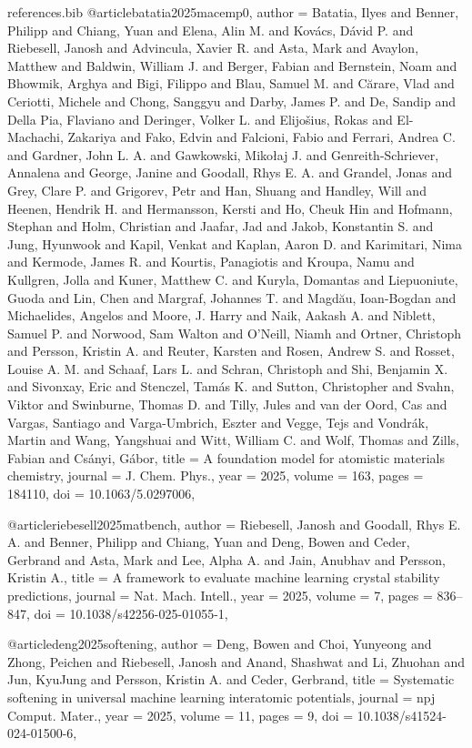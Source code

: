 \begin{filecontents*}[overwrite]{references.bib}
@article{batatia2025macemp0,
  author = {Batatia, Ilyes and Benner, Philipp and Chiang, Yuan and Elena, Alin M. and Kovács, Dávid P. and Riebesell, Janosh and Advincula, Xavier R. and Asta, Mark and Avaylon, Matthew and Baldwin, William J. and Berger, Fabian and Bernstein, Noam and Bhowmik, Arghya and Bigi, Filippo and Blau, Samuel M. and Cărare, Vlad and Ceriotti, Michele and Chong, Sanggyu and Darby, James P. and De, Sandip and Della Pia, Flaviano and Deringer, Volker L. and Elijošius, Rokas and El-Machachi, Zakariya and Fako, Edvin and Falcioni, Fabio and Ferrari, Andrea C. and Gardner, John L. A. and Gawkowski, Mikołaj J. and Genreith-Schriever, Annalena and George, Janine and Goodall, Rhys E. A. and Grandel, Jonas and Grey, Clare P. and Grigorev, Petr and Han, Shuang and Handley, Will and Heenen, Hendrik H. and Hermansson, Kersti and Ho, Cheuk Hin and Hofmann, Stephan and Holm, Christian and Jaafar, Jad and Jakob, Konstantin S. and Jung, Hyunwook and Kapil, Venkat and Kaplan, Aaron D. and Karimitari, Nima and Kermode, James R. and Kourtis, Panagiotis and Kroupa, Namu and Kullgren, Jolla and Kuner, Matthew C. and Kuryla, Domantas and Liepuoniute, Guoda and Lin, Chen and Margraf, Johannes T. and Magdău, Ioan-Bogdan and Michaelides, Angelos and Moore, J. Harry and Naik, Aakash A. and Niblett, Samuel P. and Norwood, Sam Walton and O’Neill, Niamh and Ortner, Christoph and Persson, Kristin A. and Reuter, Karsten and Rosen, Andrew S. and Rosset, Louise A. M. and Schaaf, Lars L. and Schran, Christoph and Shi, Benjamin X. and Sivonxay, Eric and Stenczel, Tamás K. and Sutton, Christopher and Svahn, Viktor and Swinburne, Thomas D. and Tilly, Jules and van der Oord, Cas and Vargas, Santiago and Varga-Umbrich, Eszter and Vegge, Tejs and Vondrák, Martin and Wang, Yangshuai and Witt, William C. and Wolf, Thomas and Zills, Fabian and Csányi, Gábor},
  title = {A foundation model for atomistic materials chemistry},
  journal = {J. Chem. Phys.},
  year = {2025},
  volume = {163},
  pages = {184110},
  doi = {10.1063/5.0297006},
}

@article{riebesell2025matbench,
  author = {Riebesell, Janosh and Goodall, Rhys E. A. and Benner, Philipp and Chiang, Yuan and Deng, Bowen and Ceder, Gerbrand and Asta, Mark and Lee, Alpha A. and Jain, Anubhav and Persson, Kristin A.},
  title = {A framework to evaluate machine learning crystal stability predictions},
  journal = {Nat. Mach. Intell.},
  year = {2025},
  volume = {7},
  pages = {836--847},
  doi = {10.1038/s42256-025-01055-1},
}

@article{deng2025softening,
  author = {Deng, Bowen and Choi, Yunyeong and Zhong, Peichen and Riebesell, Janosh and Anand, Shashwat and Li, Zhuohan and Jun, KyuJung and Persson, Kristin A. and Ceder, Gerbrand},
  title = {Systematic softening in universal machine learning interatomic potentials},
  journal = {npj Comput. Mater.},
  year = {2025},
  volume = {11},
  pages = {9},
  doi = {10.1038/s41524-024-01500-6},
}


\end{filecontents*}
